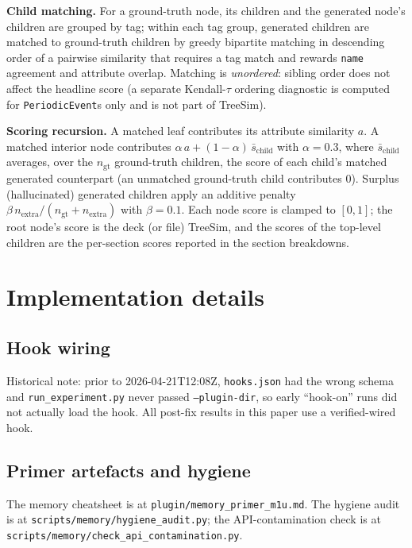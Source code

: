 \documentclass{article}
\begin{document}
\textbf{Child matching.} For a ground-truth node, its children and the generated node's children are grouped by tag; within each tag group, generated children are matched to ground-truth children by greedy bipartite matching in descending order of a pairwise similarity that requires a tag match and rewards \texttt{name} agreement and attribute overlap. Matching is \emph{unordered}: sibling order does not affect the headline score (a separate Kendall-$\tau$ ordering diagnostic is computed for \texttt{PeriodicEvent}s only and is not part of TreeSim).

\textbf{Scoring recursion.} A matched leaf contributes its attribute similarity $a$. A matched interior node contributes $\alpha\,a + (1-\alpha)\,\bar{s}_{\mathrm{child}}$ with $\alpha=0.3$, where $\bar{s}_{\mathrm{child}}$ averages, over the $n_{\mathrm{gt}}$ ground-truth children, the score of each child's matched generated counterpart (an unmatched ground-truth child contributes $0$). Surplus (hallucinated) generated children apply an additive penalty $\beta\,n_{\mathrm{extra}}/(n_{\mathrm{gt}}+n_{\mathrm{extra}})$ with $\beta=0.1$. Each node score is clamped to $[0,1]$; the root node's score is the deck (or file) TreeSim, and the scores of the top-level children are the per-section scores reported in the section breakdowns.

\section{Implementation details}
\label{app:impl}

\subsection{Hook wiring}
Historical note: prior to 2026-04-21T12:08Z, \texttt{hooks.json} had the wrong schema and \texttt{run\_experiment.py} never passed \texttt{--plugin-dir}, so early ``hook-on'' runs did not actually load the hook. All post-fix results in this paper use a verified-wired hook.

\subsection{Primer artefacts and hygiene}
The memory cheatsheet is at \texttt{plugin/memory\_primer\_m1u.md}. The hygiene audit is at \texttt{scripts/memory/hygiene\_audit.py}; the API-contamination check is at \texttt{scripts/memory/check\_api\_contamination.py}.
\end{document}
